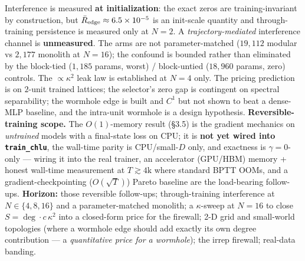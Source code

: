 \documentclass[11pt]{article}
\begin{document}
Interference is measured \textbf{at initialization}: the exact zeros are training-invariant by construction, but $\bar R_{\rm edge}\approx6.5\times10^{-5}$ is an init-scale quantity and through-training persistence is measured only at $N=2$. A \emph{trajectory-mediated} interference channel is \textbf{unmeasured}. The arms are not parameter-matched ($19{,}112$ modular vs $2{,}177$ monolith at $N=16$); the confound is bounded rather than eliminated by the block-tied ($1{,}185$ params, worst) / block-untied ($18{,}960$ params, zero) controls. The $\propto\kappa^2$ leak law is established at $N=4$ only. The pricing prediction is on $2$-unit trained lattices; the selector's zero gap is contingent on spectral separability; the wormhole edge is built and $C^1$ but not shown to beat a dense-MLP baseline, and the intra-unit wormhole is a design hypothesis. \textbf{Reversible-training scope.} The $O(1)$-memory result (\S3.5) is the gradient mechanics on \emph{untrained} models with a final-state loss on CPU; it is \textbf{not yet wired into \texttt{train\_chlu}}, the wall-time parity is CPU/small-$D$ only, and exactness is $\gamma=0$-only --- wiring it into the real trainer, an accelerator (GPU/HBM) memory + honest wall-time measurement at $T\gtrsim4\mathrm{k}$ where standard BPTT OOMs, and a gradient-checkpointing ($O(\sqrt T)$) Pareto baseline are the load-bearing follow-ups. \textbf{Horizon:} those reversible follow-ups; through-training interference at $N\in\{4,8,16\}$ and a parameter-matched monolith; a $\kappa$-sweep at $N=16$ to close $S=\deg\cdot c\,\kappa^2$ into a closed-form price for the firewall; 2-D grid and small-world topologies (where a wormhole edge should add exactly its own degree contribution --- a \emph{quantitative price for a wormhole}); the irrep firewall; real-data banding.

\appendix
\end{document}
